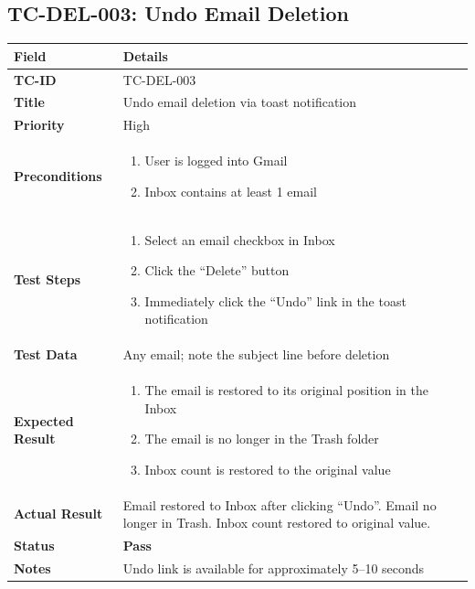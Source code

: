 \documentclass[12pt,a4paper]{article}
\begin{document}
\subsection{TC-DEL-003: Undo Email Deletion}

\begin{longtable}{|L{3.5cm}|L{11.5cm}|}
\hline
{}\textbf{Field} & \textbf{Details} \\
\hline
\textbf{TC-ID}           & TC-DEL-003 \\
\hline
\textbf{Title}           & Undo email deletion via toast notification \\
\hline
\textbf{Priority}        & High \\
\hline
\textbf{Preconditions}   & \begin{enumerate}[noitemsep,topsep=0pt]
                              \item User is logged into Gmail
                              \item Inbox contains at least 1 email
                            \end{enumerate} \\
\hline
\textbf{Test Steps}      & \begin{enumerate}[noitemsep,topsep=0pt]
                              \item Select an email checkbox in Inbox
                              \item Click the ``Delete'' button
                              \item Immediately click the ``Undo'' link in the toast notification
                            \end{enumerate} \\
\hline
\textbf{Test Data}       & Any email; note the subject line before deletion \\
\hline
\textbf{Expected Result} & \begin{enumerate}[noitemsep,topsep=0pt]
                              \item The email is restored to its original position in the Inbox
                              \item The email is no longer in the Trash folder
                              \item Inbox count is restored to the original value
                            \end{enumerate} \\
\hline
\textbf{Actual Result}   & Email restored to Inbox after clicking ``Undo''. Email no longer in Trash. Inbox count restored to original value. \\
\hline
\textbf{Status}          & \textcolor{passgreen}{\textbf{Pass}} \\
\hline
\textbf{Notes}           & Undo link is available for approximately 5--10 seconds \\
\hline
\end{longtable}
\end{document}
